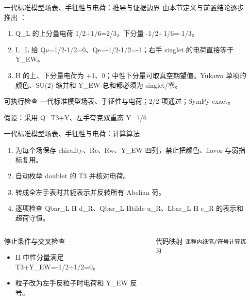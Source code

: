 \begin{frame}[t]{一代标准模型场表、手征性与电荷：推导与证据边界}
\footnotesize
{}\quad 由本节定义与前置结论逐步推出 ：
\begin{enumerate}
\item Q\_L 的上分量电荷 1/\allowbreak{}2+1/\allowbreak{}6=2/\allowbreak{}3，下分量 -1/\allowbreak{}2+1/\allowbreak{}6=-1/\allowbreak{}3。
\item L\_L 给 Q\ensuremath{\nu}=1/\allowbreak{}2-1/\allowbreak{}2=0、Qe=-1/\allowbreak{}2-1/\allowbreak{}2=-1；右手 singlet 的电荷直接等于 Y\_EW。
\item H 的上、下分量电荷为 +1、0；中性下分量可取真空期望值。Yukawa 单项的颜色、SU(2) 缩并和 Y\_EW 总和都必须为 singlet/\allowbreak{}零。
\end{enumerate}\begin{block}{可执行检查}
\quad 一代标准模型场表、手征性与电荷；2/2 项通过；SymPy exact。
\par\scriptsize 假设：采用 Q=T3+Y、左手夸克双重态 Y=1/\allowbreak{}6
\end{block}
\end{frame}

\begin{frame}[t]{一代标准模型场表、手征性与电荷：计算算法}
\footnotesize
{}\begin{enumerate}
\item 为每个场保存 chirality、Rc、Rw、Y\_EW 四列，禁止把颜色、flavor 与弱指标复用。
\item 自动枚举 doublet 的 T3 并核对电荷。
\item 转成全左手表时共轭表示并反转所有 Abelian 荷。
\item 逐项检查 Qbar\_L H d\_R、Qbar\_L Htilde u\_R、Lbar\_L H e\_R 的表示和超荷守恒。
\end{enumerate}\begin{columns}[T,onlytextwidth]
\begin{block}{停止条件与交叉检查}\scriptsize\begin{itemize}
\item[\CheckMark] H 中性分量满足 T3+Y\_EW=-1/\allowbreak{}2+1/\allowbreak{}2=0。
\item[\CheckMark] 粒子改为左手反粒子时电荷和 Y\_EW 反号。
\end{itemize}\end{block}
\begin{block}{代码映射}
\scriptsize \texttt{课程内纸笔/\allowbreak{}符号计算练习}
\end{block}\end{columns}\end{frame}

